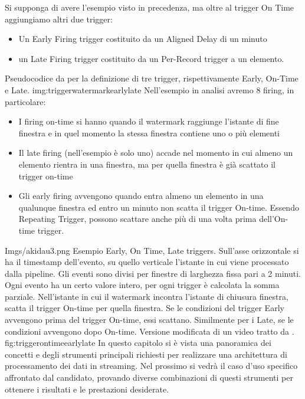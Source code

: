 Si supponga di avere l'esempio visto in precedenza, ma oltre al trigger On Time aggiungiamo altri due trigger:
\begin{itemize}
	\item Un Early Firing trigger costituito da un Aligned Delay di un minuto
	\item un Late Firing trigger costituito da un Per-Record trigger a un elemento.
\end{itemize}
{Pseudocodice da \cite{akidauchernyaklax} per la definizione di tre trigger, rispettivamente Early, On-Time e Late.}
{img:triggerwatermarkearlylate}
Nell'esempio in analisi avremo 8 firing, in particolare:
\begin{itemize}
\item I firing on-time si hanno quando il watermark raggiunge l'istante di fine finestra e in quel momento la stessa finestra contiene uno o più elementi
\item Il late firing (nell'esempio è solo uno) accade nel momento in cui almeno un elemento rientra in una finestra, ma per quella finestra è già scattato il trigger on-time
\item Gli early firing avvengono quando entra almeno un elemento in una qualunque finestra ed entro un minuto non scatta il trigger On-time. Essendo Repeating Trigger, possono scattare anche più di una volta prima dell'On-time trigger.
\end{itemize}
\img
{Imgs/akidau3.png}
{Esempio Early, On Time, Late triggers. Sull'asse orizzontale si ha il timestamp dell'evento, su quello verticale l'istante in cui viene processato dalla pipeline. Gli eventi sono divisi per finestre di larghezza fissa pari a 2 minuti. Ogni evento ha un certo valore intero, per ogni trigger è calcolata la somma parziale. Nell'istante in cui il watermark incontra l'istante di chiusura finestra, scatta il trigger On-time per quella finestra. Se le condizioni del trigger Early avvengono prima del trigger On-time, essi scattano. Similmente per i Late, se le condizioni avvengono dopo On-time. Versione modificata di un video tratto da  \cite{akidau_chernyak_lax_2018}.}
{fig:triggerontimeearlylate}
In questo capitolo si è vista una panoramica dei concetti e degli strumenti principali richiesti per realizzare una architettura di processamento dei dati in streaming. Nel prossimo si vedrà il caso d'uso specifico affrontato dal candidato, provando diverse combinazioni di questi strumenti per ottenere i risultati e le prestazioni desiderate.